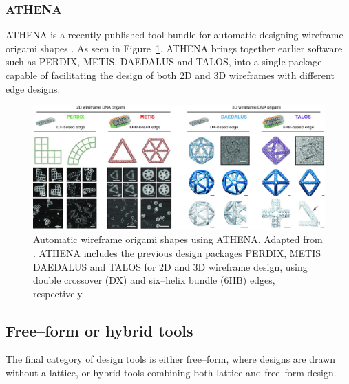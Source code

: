 \subsubsection{ATHENA}

ATHENA is a recently published tool bundle for automatic designing wireframe origami shapes \cite{athena}. As seen in Figure~\ref{fig:athena}, ATHENA brings together earlier software such as PERDIX, METIS, DAEDALUS and TALOS, into a single package capable of facilitating the design of both 2D and 3D wireframes with different edge designs.

\begin{figure}[ht]
  \begin{center}
    \includegraphics[width=\textwidth]{figures/athena.jpeg}
    \caption{Automatic wireframe origami shapes using ATHENA. Adapted from \cite{athena}. ATHENA includes the previous design packages PERDIX, METIS DAEDALUS and TALOS for 2D and 3D wireframe design, using double crossover (DX) and six--helix bundle (6HB) edges, respectively.}
    \label{fig:athena}
  \end{center}
\end{figure}


\subsection{Free--form or hybrid tools}
The final category of design tools is either free--form, where designs are drawn without a lattice, or hybrid tools combining both lattice and free--form design. 

